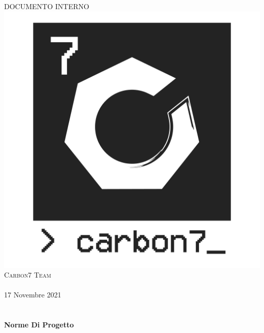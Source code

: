 \begin{center}
    \textsc{\huge DOCUMENTO INTERNO}\\[0.75cm] 
    \includegraphics[scale=0.25]{./res/logo/carbon7_small_logo-07.png}\\[1cm]
    \textsc{\Large Carbon7 Team}\\[0.3cm]
    \\[0.5cm]
    {\large 17 Novembre 2021}\\[0.5cm] %
    \\[0.5cm]

    \HRule \\[0.4cm]
    {\huge \bfseries Norme Di Progetto}\\[0.2cm]
    \HRule \\[1.5cm]

    
\end{center}
\newpage